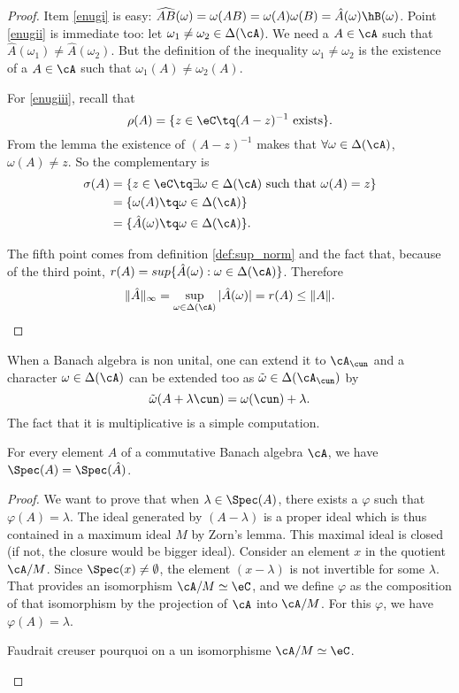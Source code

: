 \begin{proof}
Item \ref{enugi} is easy: $\widehat{AB}(\omega)=\omega(AB)=\omega(A)\omega(B)=\hat A(\omega)\hB(\omega)$. Point \ref{enugii} is immediate too: let $\omega_1\neq\omega_2\in\Delta(\cA)$. We need a $A\in\cA$ such that $\hat A(\omega_1)\neq\hat A(\omega_2)$. But the definition of the inequality $\omega_1\neq\omega_2$ is the existence of a $A\in\cA$ such that $\omega_1(A)\neq\omega_2(A)$.

For \ref{enugiii}, recall that
\[
  \rho(A)=\{z\in\eC\tq(A-z)^{-1}\textrm{ exists}\}.
\]
From the lemma the existence of $(A-z)^{-1}$ makes that $\forall\omega\in\Delta(\cA)$, $\omega(A)\neq z$. So the complementary is
\begin{equation}
\begin{split}
 \sigma(A)&=\{z\in\eC\tq\exists\omega\in\Delta(\cA)\textrm{ such that }\omega(A)=z\}\\
          &=\{\omega(A)\tq\omega\in\Delta(\cA)\}\\
          &=\{\hat A(\omega)\tq\omega\in\Delta(\cA)\}.
\end{split}
\end{equation}

The fifth point comes from definition \ref{def:sup_norm} and the fact that, because of the third point,  $r(A)=sup\{\hat A(\omega):\omega\in\Delta(\cA)\}$.
Therefore
\[
\|\hat A\|_{\infty}=\sup_{\omega\in\Delta(\cA)}|\hat A(\omega)|=r(A)\leq\|A\|.
\]
\end{proof}

When a Banach algebra is non unital, one can extend it to $\cA_{\cun}$ and a character $\omega\in\Delta(\cA)$ can be extended too as $\tilde{\omega}\in\Delta(\cA_{\cun})$ by
\[
  \tilde{\omega}(A+\lambda\cun)=\omega(\cun)+\lambda.
\]
The fact that it is multiplicative is a simple computation.

\begin{theorem}
For every element $A$ of a commutative Banach algebra $\cA$, we have $\Spec(A)=\Spec(\hat A)$.
\end{theorem}

\begin{proof}
We want to prove that when $\lambda\in\Spec(A)$, there exists a $\varphi$ such that $\varphi(A)=\lambda$. The ideal generated by $(A-\lambda)$ is a proper ideal which is thus contained in a maximum ideal $M$ by Zorn's lemma. This maximal ideal is closed (if not, the closure would be bigger ideal). Consider an element $x$ in the quotient $\cA/M$. Since $\Spec(x)\neq\emptyset$, the element $(x-\lambda)$ is not invertible for some $\lambda$. That provides an isomorphism $\cA/M\simeq \eC$, and we define $\varphi$ as the composition of that isomorphism by the projection of $\cA$ into $\cA/M$. For this $\varphi$, we have $\varphi(A)=\lambda$.

\begin{probleme}
Faudrait creuser pourquoi on a un isomorphisme $\cA/M\simeq\eC$.
\end{probleme}
\end{proof}

